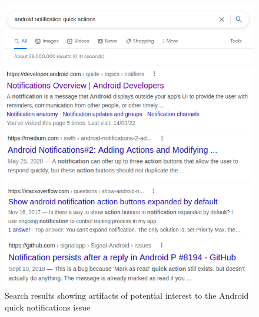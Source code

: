 
\vspace{3mm}
\begin{figure}
\centering    
\parbox{\textwidth}{%
\centering
\includegraphics[width=.80\textwidth]{cp1/task-google-search}
}
\parbox{\textwidth}{%
\centering
\includegraphics[width=.70\textwidth]{cp1/api-documentation-search-result}
}
\parbox{\textwidth}{%
\centering
\includegraphics[width=.70\textwidth]{cp1/misc-documentation-search-result}
}
\parbox{\textwidth}{%
\centering
\includegraphics[width=.70\textwidth]{cp1/so-documentation-search-result}
}
\parbox{\textwidth}{%
\centering
\includegraphics[width=.70\textwidth]{cp1/git-documentation-search-result}
}
\caption{Search results showing artifacts of potential interest to the Android quick notifications issue}
\label{fig:android-search-results}
\end{figure}


